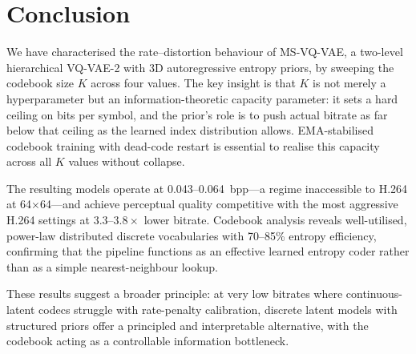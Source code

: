 \documentclass{article}
\newcommand{\model}{\textsc{MS-VQ-VAE}}
\begin{document}
\section{Conclusion}
\label{sec:conclusion}

We have characterised the rate--distortion behaviour of \model{}, a
two-level hierarchical VQ-VAE-2 with 3D autoregressive entropy priors, by
sweeping the codebook size $K$ across four values.
The key insight is that $K$ is not merely a hyperparameter but an
information-theoretic capacity parameter: it sets a hard ceiling on bits per
symbol, and the prior's role is to push actual bitrate as far below that
ceiling as the learned index distribution allows.
EMA-stabilised codebook training with dead-code restart is essential to
realise this capacity across all $K$ values without collapse.

The resulting models operate at 0.043--0.064~bpp---a regime inaccessible to
H.264 at 64$\times$64---and achieve perceptual quality competitive with the
most aggressive H.264 settings at $3.3$--$3.8\times$ lower bitrate.
Codebook analysis reveals well-utilised, power-law distributed discrete
vocabularies with 70--85\% entropy efficiency, confirming that the pipeline
functions as an effective learned entropy coder rather than as a simple
nearest-neighbour lookup.

These results suggest a broader principle: at very low bitrates where
continuous-latent codecs struggle with rate-penalty calibration, discrete
latent models with structured priors offer a principled and interpretable
alternative, with the codebook acting as a controllable information bottleneck.

\begin{small}

\end{small}
\end{document}
